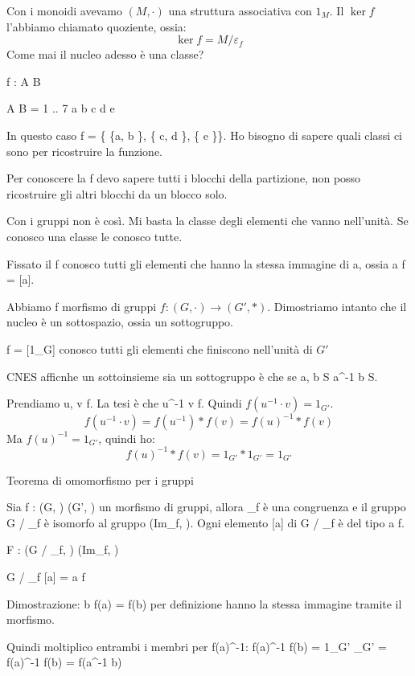 Con i monoidi avevamo $(M, \cdot)$ una struttura associativa con $1_M$. Il $\ker f$ l'abbiamo chiamato quoziente, ossia:
\[
\ker f = M / \varepsilon_f
\]
Come mai il nucleo adesso \`e una classe? 

f : A \to B

A B = 1 .. 7
a 
b 
c 
d 
e 

In questo caso \ker f = \{ \{a, b \}, \{ c, d \}, \{ e \}\}. Ho bisogno di sapere quali classi ci sono per ricostruire la funzione.

Per conoscere la f devo sapere tutti i blocchi della partizione, non posso ricostruire gli altri blocchi da un blocco solo.

Con i gruppi non \`e cos\`i. Mi basta la classe degli elementi che vanno nell'unit\`a. Se conosco una classe le conosco tutte.

Fissato il \ker f conosco tutti gli elementi che hanno la stessa immagine di a, ossia a \cdot \ker f = [a].

Abbiamo f morfismo di gruppi $ f : (G, \cdot ) \to (G', \ast)$. Dimostriamo intanto che il nucleo \`e un sottospazio, ossia un sottogruppo.

\ker f = [1_G] conosco tutti gli elementi che finiscono nell'unit\`a di $G'$

CNES afficnhe un sottoinsieme sia un sottogruppo \`e che se a, b \in S \Rightarrow a^{-1} b \in S.

Prendiamo u, v \in \ker f. La tesi \`e che u^{-1} \cdot v \in \ker f. Quindi $f ( u^{-1} \cdot v ) = 1_{G'}$.
\[
f( u^{-1} \cdot v ) = f(u^{-1}) \ast f(v) = f(u)^{-1} \ast f(v)
\]
Ma $f(u)^{-1} = 1_{G'}$, quindi ho:
\[
f(u)^{-1} \ast f(v) = 1_{G'} \ast 1_{G'} = 1_{G'}
\]

Teorema di omomorfismo per i gruppi

Sia f : (G, \cdot) \to (G', \ast) un morfismo di gruppi, allora \varepsilon_f \`e una congruenza e il gruppo G / \varepsilon_f \`e isomorfo al gruppo (Im_f, \ast). Ogni elemento [a] di G / \varepsilon_f \`e del tipo a \cdot \ker f.

F : (G / \varepsilon_f, \cdot) \to (Im_f, \ast)

\forall [a] \in G / \varepsilon_f [a] = a \cdot \ker f

Dimostrazione:
b \in [a] \Rightarrow f(a) = f(b) per definizione hanno la stessa immagine tramite il morfismo.

Quindi moltiplico entrambi i membri per f(a)^{-1}: f(a)^{-1} \ast f(b) = 1_{G'} _{G'} = f(a)^{-1} \ast f(b) = f(a^{-1} \cdot b)

